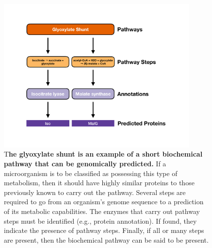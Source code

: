 \begin{figure}[!ht]
  \centering
	\includegraphics[width=0.9\textwidth]{media/pathway_analysis_steps.pdf}
	 \caption[The glyoxylate shunt is an example of a short biochemical pathway that can be genomically predicted.]{T\textbf{he glyoxylate shunt is an example of a short biochemical pathway that can be genomically predicted.} If a microorganism is to be classified as possessing this type of metabolism, then it should have highly similar proteins to those previously known to carry out the pathway. Several steps are required to go from an organism's genome sequence to a prediction of its metabolic capabilities. The enzymes that carry out pathway steps must be identified (e.g., protein annotation). If found, they indicate the presence of pathway steps. Finally, if all or many steps are present, then the biochemical pathway can be said to be present.}
	 \label{fig:pathway-analysis-steps}
\end{figure}

